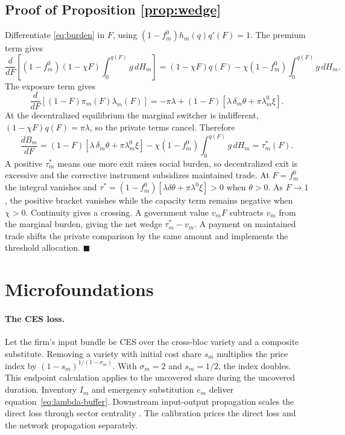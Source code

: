 \documentclass[11pt]{article}
\theoremstyle{definition}
\begin{document}
\subsection{Proof of Proposition \ref{prop:wedge}}
Differentiate \eqref{eq:burden} in $F$, using $(1-f^0_m)h_m(q)q'(F)=1$. The premium term gives
\[
\frac{d}{dF}\left[(1-f^0_m)(1-\chi F)\int_0^{q(F)}g\,dH_m\right]
=(1-\chi F)q(F)-\chi(1-f^0_m)\int_0^{q(F)}g\,dH_m.
\]
The exposure term gives
\[
\frac{d}{dF}\left[(1-F)\pi_m(F)\lambda_m(F)\right]
=-\pi\lambda+(1-F)\left[\lambda\,\delta_m\theta+\pi\lambda_m^0\xi\right].
\]
At the decentralized equilibrium the marginal switcher is indifferent, $(1-\chi F)q(F)=\pi\lambda$, so the private terms cancel. Therefore
\[
\frac{dB_m}{dF}
=(1-F)\left[\lambda\,\delta_m\theta+\pi\lambda_m^0\xi\right]
-\chi(1-f^0_m)\int_0^{q(F)}g\,dH_m
=\tau^*_m(F).
\]
A positive $\tau^*_m$ means one more exit raises social burden, so decentralized exit is excessive and the corrective instrument subsidizes maintained trade. At $F=f^0_m$ the integral vanishes and $\tau^*=(1-f^0_m)[\lambda\delta\theta+\pi\lambda^0\xi]>0$ when $\theta>0$. As $F\to1$, the positive bracket vanishes while the capacity term remains negative when $\chi>0$. Continuity gives a crossing. A government value $v_mF$ subtracts $v_m$ from the marginal burden, giving the net wedge $\tau_m^*-v_m$. A payment on maintained trade shifts the private comparison by the same amount and implements the threshold allocation. $\blacksquare$

\section{Microfoundations}\label{app:micro}

\paragraph{The CES loss.} Let the firm's input bundle be CES over the cross-bloc variety and a composite substitute. Removing a variety with initial cost share $s_m$ multiplies the price index by $(1-s_m)^{1/(1-\sigma_m)}$. With $\sigma_m=2$ and $s_m=1/2$, the index doubles. This endpoint calculation applies to the uncovered share during the uncovered duration. Inventory $I_m$ and emergency substitution $e_m$ deliver equation~\eqref{eq:lambda-buffer}. Downstream input-output propagation scales the direct loss through sector centrality \citep{BaqaeeFarhi2019,CarvalhoEtAl2021}. The calibration prices the direct loss and the network propagation separately.
\end{document}
